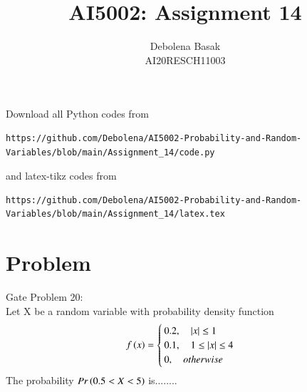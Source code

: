 \documentclass[journal,12pt,twocolumn]{IEEEtran}
\begin{document}
     \def\rightbox#1{\makebox[0in][r]{#1}}
     \def\centbox#1{\makebox[0in]{#1}}
     \def\topbox#1{\raisebox{-\baselineskip}[0in][0in]{#1}}
     \def\midbox#1{\raisebox{-0.5\baselineskip}[0in][0in]{#1}}
\vspace{3cm}
\title{AI5002: Assignment 14}
\author{Debolena Basak\\ AI20RESCH11003}
\maketitle
\newpage
\bigskip
\renewcommand{\thefigure}{\theenumi}
\renewcommand{\thetable}{\theenumi}
Download all Python codes from 
\begin{lstlisting}
https://github.com/Debolena/AI5002-Probability-and-Random-Variables/blob/main/Assignment_14/code.py
\end{lstlisting}
%
and latex-tikz codes from 
%
\begin{lstlisting}
https://github.com/Debolena/AI5002-Probability-and-Random-Variables/blob/main/Assignment_14/latex.tex
\end{lstlisting}
\section{Problem}
Gate Problem 20:\\
Let X be a random variable with probability
density function
\begin{align}
    f\left(x\right) = 
    \begin{cases}
    0.2 , \quad |x|\le 1 \\
    0.1, \quad 1\le |x| \le 4\\
    0, \quad otherwise \label{fx}
    \end{cases}
\end{align}
The probability $Pr\left(0.5 < X < 5\right)$ is........
\end{document}
